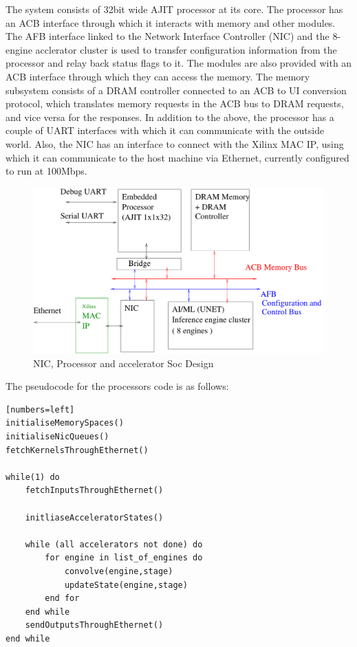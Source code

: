 \documentclass[12pt]{report}
\begin{document}
The system consists of 32bit wide AJIT processor at its core. The processor has an ACB interface through which it interacts with memory and other modules. The AFB interface linked to the Network Interface Controller (NIC) and the 8-engine acclerator cluster is used to transfer configuration information from the processor and relay back status flags to it. The modules are also provided with an ACB interface through which they can access the memory. The memory subsystem consists of a DRAM controller connected to an ACB to UI conversion protocol, which translates memory requests in the ACB bus to DRAM requests, and vice versa for the responses. In addition to the above, the processor has a couple of UART interfaces with which it can communicate with the outside world. Also, the NIC has an interface to connect with the Xilinx MAC IP, using which it can communicate to the host machine via Ethernet, currently configured to run at 100Mbps. 
\\
		\begin{figure}[h]
			\centering
			\includegraphics[width=12cm]{./figures/BlockDiagram.pdf}
			\caption{NIC, Processor and accelerator Soc Design}
			\label{fig:SoC}
		\end{figure}

		\clearpage
The pseudocode for the processors code is as follows:

\begin{verbatim}[numbers=left]
initialiseMemorySpaces()
initialiseNicQueues()
fetchKernelsThroughEthernet()

while(1) do
	fetchInputsThroughEthernet()
	
	initliaseAcceleratorStates()
	
	while (all accelerators not done) do
		for engine in list_of_engines do
			convolve(engine,stage)
			updateState(engine,stage)
		end for
	end while
	sendOutputsThroughEthernet()
end while
\end{verbatim}
\end{document}
